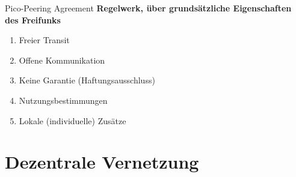\documentclass{beamer}
\begin{document}
	\begin{frame}{Pico-Peering Agreement}
		\textbf{Regelwerk, über grundsätzliche Eigenschaften des Freifunks}

		\begin{enumerate}
			\item Freier Transit
			\item Offene Kommunikation
			\item Keine Garantie (Haftungsausschluss)
			\item Nutzungsbestimmungen
			\item Lokale (individuelle) Zusätze
		\end{enumerate}
	\end{frame}

	\section{Dezentrale Vernetzung}
\end{document}
